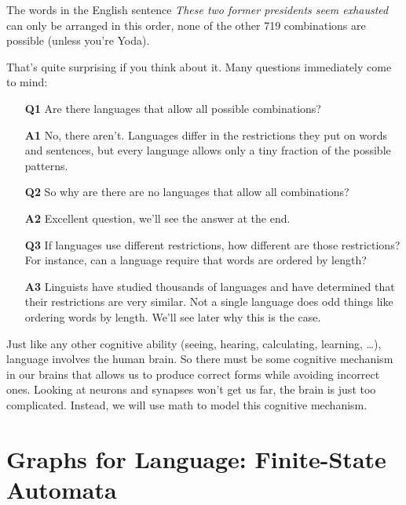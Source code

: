 \begin{examplebox}
    The words in the English sentence \emph{These two former presidents seem exhausted} can only be arranged in this order, none of the other 719 combinations are possible (unless you're Yoda).
\end{examplebox}

That's quite surprising if you think about it.
Many questions immediately come to mind:
%
\begin{itemize}
    \item[\bfseries\color{brown} Q1] Are there languages that allow all possible combinations? 
    \item[\bfseries\color{brown} A1] No, there aren't.
        Languages differ in the restrictions they put on words and sentences, but every language allows only a tiny fraction of the possible patterns.\\

    \item[\bfseries\color{brown} Q2] So why are there are no languages that allow all combinations?
    \item[\bfseries\color{brown} A2] Excellent question, we'll see the answer at the end.\\

    \item[\bfseries\color{brown} Q3] If languages use different restrictions, how different are those restrictions?
        For instance, can a language require that words are ordered by length?
    \item[\bfseries\color{brown} A3] Linguists have studied thousands of languages and have determined that their restrictions are very similar.
        Not a single language does odd things like ordering words by length.
        We'll see later why this is the case.
\end{itemize}

Just like any other cognitive ability (seeing, hearing, calculating, learning, \ldots), language involves the human brain.
So there must be some cognitive mechanism in our brains that allows us to produce correct forms while avoiding incorrect ones.
Looking at neurons and synapses won't get us far, the brain is just too complicated.
Instead, we will use math to model this cognitive mechanism.

\section{Graphs for Language: Finite-State Automata}


